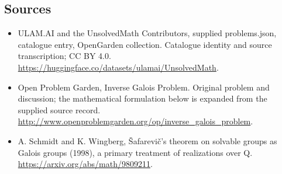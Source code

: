 \documentclass[11pt,a4paper]{article}
\begin{document}
\subsection{Sources}
\begin{itemize}
\item[S1] ULAM.AI and the UnsolvedMath Contributors, supplied problems.json, catalogue entry, OpenGarden collection. Catalogue identity and source transcription; CC BY 4.0.
\url{https://huggingface.co/datasets/ulamai/UnsolvedMath}.
\item[S2] Open Problem Garden, Inverse Galois Problem. Original problem and discussion; the mathematical formulation below is expanded from the supplied source record.
\url{http://www.openproblemgarden.org/op/inverse_galois_problem}.
\item[S3] A. Schmidt and K. Wingberg, Šafarevič’s theorem on solvable groups as Galois groups (1998), a primary treatment of realizations over Q.
\url{https://arxiv.org/abs/math/9809211}.
\end{itemize}
\end{document}
